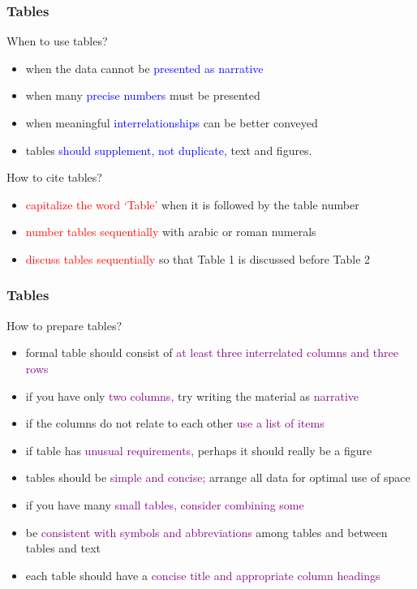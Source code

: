\documentclass[newPxFont,sthlmFooter]{beamer}
\newcommand{\fs}{\footnotesize}
\begin{document}
\begin{frame}\frametitle{Tables}
\begin{exampleblock}{\small When to use tables?}
  \begin{itemize}
  \fs
  \item when the data cannot be \textcolor{blue}{presented as narrative}
  \item when many \textcolor{blue}{precise numbers} must be presented
  \item when meaningful \textcolor{blue}{interrelationships} can be better conveyed
  \item tables \textcolor{blue}{should supplement, not duplicate,} text and figures.
  \end{itemize}
\end{exampleblock}

\begin{alertblock}{\small How to cite tables?}
  \begin{itemize}
  \fs
  \item \textcolor{red}{capitalize the word `Table'} when it is followed by the table number
  \item \textcolor{red}{number tables sequentially} with arabic or roman numerals
  \item \textcolor{red}{discuss tables sequentially} so that Table 1 is discussed before Table 2
  \end{itemize}
\end{alertblock}

\end{frame}

\begin{frame}\frametitle{Tables}
\vspace{-0.25cm}
\begin{block}{\small How to prepare tables?}
  \begin{itemize}
  \fs
  \item formal table should consist of \textcolor{purple}{at least three interrelated columns and three rows}
  \item if you have only \textcolor{purple}{two columns,} try writing the material as \textcolor{purple}{narrative}
  \item if the columns do not relate to each other \textcolor{purple}{use a list of items}
  \item if table has \textcolor{purple}{unusual requirements,} perhaps it should really be a figure
  \item tables should be \textcolor{purple}{simple and concise;} arrange all data for optimal use of space
  \item if you have many \textcolor{purple}{small tables, consider combining some}
  \item be \textcolor{purple}{consistent with symbols and abbreviations} among tables and between tables and text
  \item each table should have a \textcolor{purple}{concise title and appropriate column headings}
  \end{itemize}
\end{block}
\end{frame}
\end{document}
